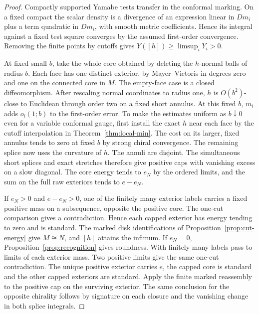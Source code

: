 \begin{proof}
Compactly supported Yamabe tests transfer in the conformal marking.
On a fixed compact the scalar density is a divergence of an expression
linear in \(Dm_i\) plus a term quadratic in \(Dm_i\), with smooth
metric coefficients. Hence its integral against a fixed test square
converges by the assumed first-order convergence. Removing the finite
points by cutoffs gives \(Y([h])\ge\limsup_iY_i>0\).

At fixed small \(b\), take the whole core obtained by deleting
the \(h\)-normal balls of radius \(b\). Each face has one distinct
exterior, by Mayer--Vietoris in degrees zero and one on the connected
core in \(M\). The empty-face case is a closed diffeomorphism.
After rescaling normal coordinates to radius one, \(h\) is
\(O(b^2)\)-close to Euclidean through order two on a fixed short
annulus. At this fixed \(b\), \(m_i\) adds \(o_i(1;b)\) to the
first-order error. To make the estimates uniform as \(b\downarrow0\)
even for a variable conformal gauge, first install the exact \(h\)
near each face by the cutoff interpolation in
Theorem~\ref{thm:local-min}. The cost on its larger, fixed annulus
tends to zero at fixed \(b\) by strong chiral convergence.
The remaining splice now uses the curvature of \(h\).
The annuli are disjoint. The simultaneous short splices and exact
stretches therefore give positive caps with vanishing excess on a
slow diagonal. The core energy tends to \(e_N\) by the ordered
limits, and the sum on the full raw exteriors tends to \(e-e_N\).

If \(e_N>0\) and \(e-e_N>0\), one of the finitely many exterior
labels carries a fixed positive mass on a subsequence, opposite the
positive core. The one-cut comparison gives a contradiction. Hence
each capped exterior has energy tending to zero and is standard.
The marked disk identifications of Proposition~\ref{prop:cut-energy}
give \(M\cong N\), and \([h]\) attains the infimum.
If \(e_N=0\), Proposition~\ref{prop:recognition} gives roundness.
With finitely many labels pass to limits of each exterior mass.
Two positive limits give the same one-cut contradiction. The
unique positive exterior carries \(e\), the capped core is standard
and the other capped exteriors are standard. Apply the finite marked
reassembly to the positive cap on the surviving exterior.
The same conclusion for the opposite chirality follows by signature
on each closure and the vanishing change in both splice integrals.
\end{proof}

